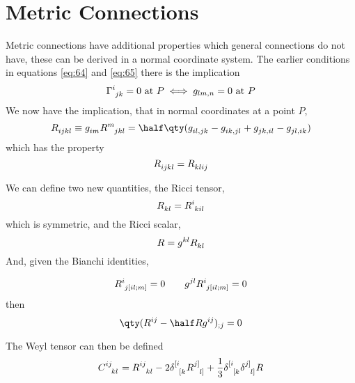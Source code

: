 \section{Metric Connections}
\label{sec:metric-connections}

Metric connections have additional properties which general
connections do not have, these can be derived in a normal coordinate
system. The earlier conditions in equations \eqref{eq:64} and
\eqref{eq:65} there is the implication
\begin{equation}
  \label{eq:66}
  \tensor{\Gamma}{^i_{jk}} = 0 \text{ at } P \iff g_{lm,n} = 0 \text{ at } P
\end{equation}
We now have the implication, that in normal coordinates at a point
$P$,
\begin{equation}
  \label{eq:67}
  \tensor{R}{_{ijkl}} \equiv \tensor{g}{_{im}} \tensor{R}{^m_{jkl}} 
  = \half \qty( \tensor{g}{_{il,jk}} - \tensor{g}{_{ik, jl}}+ \tensor{g}{_{jk, il}} - \tensor{g}{_{jl, ik}})
\end{equation}
which has the property
\begin{equation}
  \label{eq:68}
  \tensor{R}{_{ijkl}} = \tensor{R}{_{klij}}
\end{equation}

We can define two new quantities, the Ricci tensor,
\begin{equation}
  \label{eq:69}
  \tensor{R}{_{kl}} = \tensor{R}{^i_{kil}}
\end{equation}
which is symmetric, and the Ricci scalar,
\begin{equation}
  \label{eq:70}
  R = \tensor{g}{^{kl}} \tensor{R}{_{kl}}
\end{equation}
And, given the Bianchi identities,

\[ \tensor{R}{^i_{j[il;m]}} = 0 \qquad \tensor{g}{^{jl}}\tensor{R}{^i_{j[il;m]}} = 0 \]
then
\begin{equation}
  \label{eq:72}
  \qty( \tensor{R}{^{ij}} - \half R g^{ij} )_{;j} = 0
\end{equation}

The Weyl tensor can then be defined
\begin{equation}
  \label{eq:73}
  \tensor{C}{^{ij}_{kl}} = \tensor{R}{^{ij}_{kl}} - 2 \tensor{\delta}{^{[i}_{[k}} \tensor{R}{^{j]}_{l]}} + \frac{1}{3} \tensor{\delta}{^{[i}_{[k}} \tensor{\delta}{^{j]}_{l]}} R
\end{equation}

